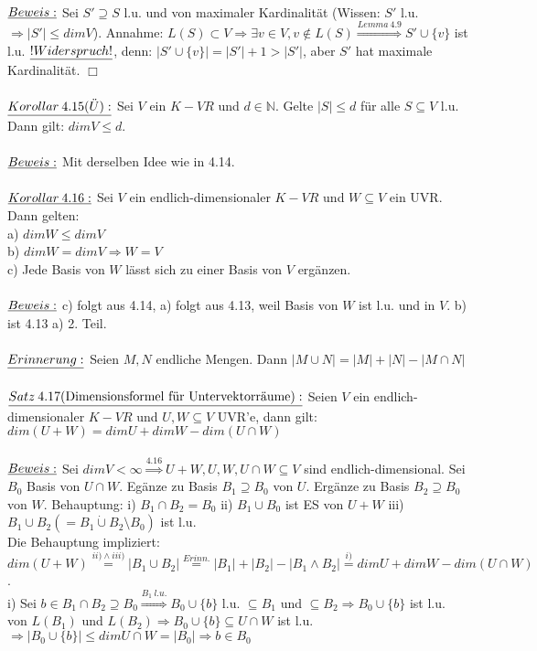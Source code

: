 \documentclass[fleqn, a4paper, 11pt]{article}
\begin{document}
\\
$\uline{Beweis:}$ Sei $S'\supseteq S$ l.u. und von maximaler Kardinalit\"at (Wissen: $S'$ l.u. $\Rightarrow|S'|\leq dim V$). Annahme: $L(S)\subset V \Rightarrow \exists v\in V,v\notin L(S)\stackrel{Lemma\:4.9}{\Rightarrow}S'\cup\{v\}$ ist l.u. $\uline{!Widerspruch!}$, denn: $|S'\cup \{v\}|=|S'|+1 > |S'|$, aber $S'$ hat maximale Kardinalit\"at. \hfill $\Box$\\
\\
$\uline{Korollar\:4.15 (\ddot{U}):}$ Sei $V$ ein $K-VR$ und $d\in\mathbb{N}$. Gelte $|S|\leq d$ f\"ur alle $S\subseteq V$ l.u. Dann gilt: $dim V\leq d$.\\
\\
$\uline{Beweis:}$ Mit derselben Idee wie in 4.14.\\
\\
$\uline{Korollar\:4.16:}$ Sei $V$ ein endlich-dimensionaler $K-VR$ und $W\subseteq V$ ein UVR. Dann gelten:\\
a) $dim W\leq dim V$\\
b) $dim W=dim V\Rightarrow W=V$\\
c) Jede Basis von $W$ l\"asst sich zu einer Basis von $V$ erg\"anzen.\\
\\
$\uline{Beweis:}$ c) folgt aus 4.14, a) folgt aus 4.13, weil Basis von $W$ ist l.u. und in $V$. b) ist 4.13 a) 2. Teil.\\
\\
$\uline{Erinnerung:}$ Seien $M,N$ endliche Mengen. Dann $|M\cup N|=|M|+|N|-|M\cap N|$\\
\\
$\uline{Satz\:4.17(\text{Dimensionsformel f\"ur Untervektorr\"aume}):}$ Seien $V$ ein endlich-dimensionaler $K-VR$ und $U,W\subseteq V$ UVR'e, dann gilt: $dim(U+W)=dim U+dim W-dim(U\cap W)$\\
\\
$\uline{Beweis:}$ Sei $dim V < \infty \stackrel{4.16}{\Rightarrow} U+W,U,W,U\cap W\subseteq V$ sind endlich-dimensional. Sei $B_0$ Basis von $U\cap W$. Eg\"anze zu Basis $B_1\supseteq B_0$ von $U$. Erg\"anze zu Basis $B_2\supseteq B_0$ von $W$. Behauptung: i) $B_1\cap B_2 =B_0$ ii) $B_1\cup B_0$ ist ES von $U+W$ iii) $B_1\cup B_2(=B_1\mathbin{\dot{\cup}} B_2\setminus B_0)$ ist l.u.\\
Die Behauptung impliziert: $dim(U+W)\stackrel{ii)\wedge iii)}{=} |B_1\cup B_2|\stackrel{Erinn.}{=} |B_1|+|B_2|-|B_1\wedge B_2|\stackrel{i)}{=} dim U+dim W-dim(U\cap W)$.\\
i) Sei $b\in B_1\cap B_2\supseteq B_0\stackrel{B_1\: l.u.}{\Rightarrow} B_0\cup\{b\}$ l.u. $\subseteq B_1$ und $\subseteq B_2\Rightarrow B_0\cup\{b\}$ ist l.u. von $L(B_1)$ und $L(B_2)\Rightarrow B_0\cup\{b\}\subseteq U\cap W$ ist l.u. $\Rightarrow |B_0\cup\{b\}|\leq dim U\cap W=|B_0|\Rightarrow b\in B_0$\\
\end{document}
